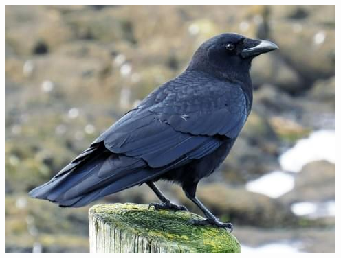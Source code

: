 \documentclass[12pt]{book}
\begin{document}
\begin{enumerate}
\centering\includegraphics[scale=0.8]{Question2020Image.jpg}



\end{enumerate}
\end{document}
